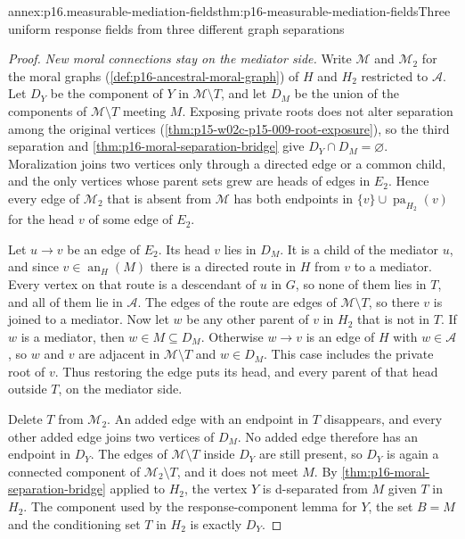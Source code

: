 \begin{annexitem}{annex:p16.measurable-mediation-fields}{thm:p16-measurable-mediation-fields}{Three uniform response fields from three different graph separations}
\begin{proof}
\emph{New moral connections stay on the mediator side.} Write
\(\mathcal M\) and \(\mathcal M_2\) for the moral graphs
(\cref{def:p16-ancestral-moral-graph}) of \(H\) and \(H_2\)
restricted to \(\mathcal A\). Let \(D_Y\) be the component of \(Y\)
in \(\mathcal M\setminus T\), and let \(D_M\) be the union of the
components of \(\mathcal M\setminus T\) meeting \(M\). Exposing
private roots does not alter separation among the original vertices
(\cref{thm:p15-w02c-p15-009-root-exposure}), so the third separation and \cref{thm:p16-moral-separation-bridge}
give \(D_Y\cap D_M=\varnothing\). Moralization joins two vertices
only through a directed edge or a common child, and the only vertices
whose parent sets grew are heads of edges in \(E_2\). Hence every
edge of \(\mathcal M_2\) that is absent from \(\mathcal M\) has both
endpoints in \(\{v\}\cup\operatorname{pa}_{H_2}(v)\) for the head
\(v\) of some edge of \(E_2\).

Let \(u\to v\) be an edge of \(E_2\). Its head \(v\) lies in \(D_M\).
It is a child of the mediator \(u\), and since
\(v\in\operatorname{an}_H(M)\) there is a directed route in \(H\)
from \(v\) to a mediator. Every vertex on that route is a descendant
of \(u\) in \(G\), so none of them lies in \(T\), and all of them
lie in \(\mathcal A\). The edges of the route are edges of
\(\mathcal M\setminus T\), so there \(v\) is joined to a mediator.
Now let \(w\) be any other parent of \(v\) in \(H_2\) that is not in
\(T\). If \(w\) is a mediator, then \(w\in M\subseteq D_M\).
Otherwise \(w\to v\) is an edge of \(H\) with \(w\in\mathcal A\),
so \(w\) and \(v\) are adjacent in \(\mathcal M\setminus T\) and
\(w\in D_M\). This case includes the private root of \(v\). Thus
restoring the edge puts its head, and every parent of that head
outside \(T\), on the mediator side.

Delete \(T\) from \(\mathcal M_2\). An added edge with an endpoint in
\(T\) disappears, and every other added edge joins two vertices of
\(D_M\). No added edge therefore has an endpoint in \(D_Y\). The edges
of \(\mathcal M\setminus T\) inside \(D_Y\) are still present, so
\(D_Y\) is again a connected component of \(\mathcal M_2\setminus T\),
and it does not meet \(M\). By \cref{thm:p16-moral-separation-bridge}
applied to \(H_2\), the vertex \(Y\) is d-separated from \(M\) given
\(T\) in \(H_2\). The component used by the response-component lemma
for \(Y\), the set \(B=M\) and the conditioning set \(T\) in \(H_2\)
is exactly \(D_Y\).


\end{proof}
\end{annexitem}
